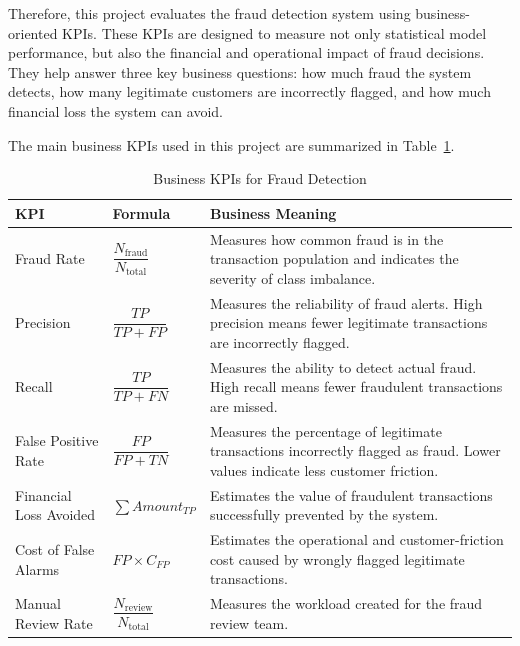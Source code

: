 Therefore, this project evaluates the fraud detection system using business-oriented KPIs. These KPIs are designed to measure not only statistical model performance, but also the financial and operational impact of fraud decisions. They help answer three key business questions: how much fraud the system detects, how many legitimate customers are incorrectly flagged, and how much financial loss the system can avoid.

The main business KPIs used in this project are summarized in Table~\ref{tab:business-kpis}.

\begin{table}[htbp]
\centering
\caption{Business KPIs for Fraud Detection}
\label{tab:business-kpis}
\small
\renewcommand{\arraystretch}{1.35}
\begin{tabularx}{\textwidth}{p{3.0cm} p{3.2cm} X}
\toprule
\textbf{KPI} & \textbf{Formula} & \textbf{Business Meaning} \\
\midrule

Fraud Rate &
$\dfrac{N_{\text{fraud}}}{N_{\text{total}}}$ &
Measures how common fraud is in the transaction population and indicates the severity of class imbalance. \\

\midrule
Precision &
$\dfrac{TP}{TP + FP}$ &
Measures the reliability of fraud alerts. High precision means fewer legitimate transactions are incorrectly flagged. \\

\midrule
Recall &
$\dfrac{TP}{TP + FN}$ &
Measures the ability to detect actual fraud. High recall means fewer fraudulent transactions are missed. \\

\midrule
False Positive Rate &
$\dfrac{FP}{FP + TN}$ &
Measures the percentage of legitimate transactions incorrectly flagged as fraud. Lower values indicate less customer friction. \\

\midrule
Financial Loss Avoided &
$\sum Amount_{TP}$ &
Estimates the value of fraudulent transactions successfully prevented by the system. \\

\midrule
Cost of False Alarms &
$FP \times C_{FP}$ &
Estimates the operational and customer-friction cost caused by wrongly flagged legitimate transactions. \\

\midrule
Manual Review Rate &
$\dfrac{N_{\text{review}}}{N_{\text{total}}}$ &
Measures the workload created for the fraud review team. \\

\bottomrule
\end{tabularx}
\end{table}

